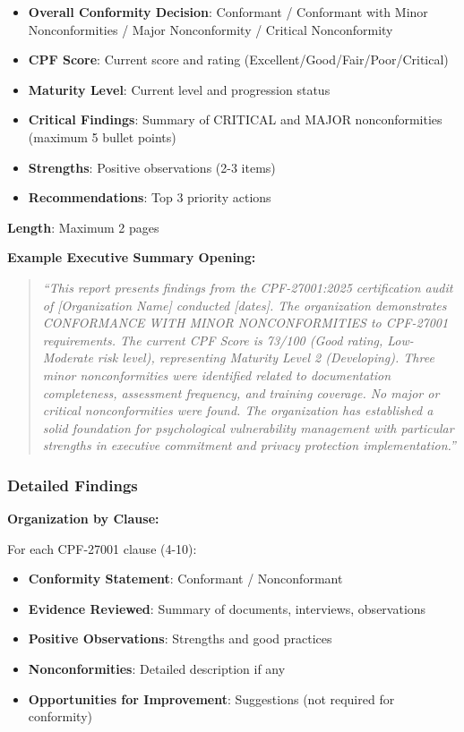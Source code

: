 \documentclass[11pt,a4paper]{article}
\begin{document}
\begin{itemize}
\item \textbf{Overall Conformity Decision}: Conformant / Conformant with Minor Nonconformities / Major Nonconformity / Critical Nonconformity
\item \textbf{CPF Score}: Current score and rating (Excellent/Good/Fair/Poor/Critical)
\item \textbf{Maturity Level}: Current level and progression status
\item \textbf{Critical Findings}: Summary of CRITICAL and MAJOR nonconformities (maximum 5 bullet points)
\item \textbf{Strengths}: Positive observations (2-3 items)
\item \textbf{Recommendations}: Top 3 priority actions
\end{itemize}

\textbf{Length}: Maximum 2 pages

\textbf{Example Executive Summary Opening:}

\begin{quote}
\textit{``This report presents findings from the CPF-27001:2025 certification audit of [Organization Name] conducted [dates]. The organization demonstrates CONFORMANCE WITH MINOR NONCONFORMITIES to CPF-27001 requirements. The current CPF Score is 73/100 (Good rating, Low-Moderate risk level), representing Maturity Level 2 (Developing). Three minor nonconformities were identified related to documentation completeness, assessment frequency, and training coverage. No major or critical nonconformities were found. The organization has established a solid foundation for psychological vulnerability management with particular strengths in executive commitment and privacy protection implementation.''}
\end{quote}

\subsubsection{Detailed Findings}

\textbf{Organization by Clause:}

For each CPF-27001 clause (4-10):
\begin{itemize}
\item \textbf{Conformity Statement}: Conformant / Nonconformant
\item \textbf{Evidence Reviewed}: Summary of documents, interviews, observations
\item \textbf{Positive Observations}: Strengths and good practices
\item \textbf{Nonconformities}: Detailed description if any
\item \textbf{Opportunities for Improvement}: Suggestions (not required for conformity)
\end{itemize}
\end{document}
